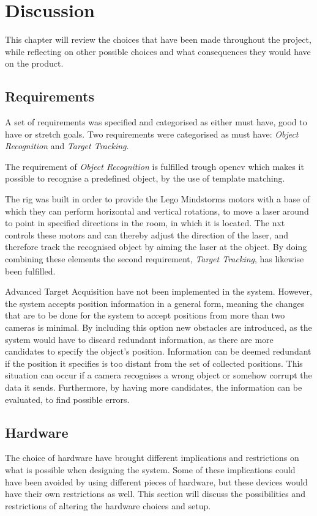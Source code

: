 \chapter{Discussion}
\label{chpt:discussion}
This chapter will review the choices that have been made throughout the project, while reflecting on other possible choices and what consequences they would have on the product.

\section{Requirements}\label{sec_disc_requirements}
A set of requirements was specified and categorised as either must have, good to have or stretch goals. Two requirements were categorised as must have: \textit{Object Recognition} and \textit{Target Tracking}.

The requirement of \textit{Object Recognition} is fulfilled trough \gls{opencv} which makes it possible to recognise a predefined object, by the use of template matching. 

The rig was built in order to provide the Lego Mindstorms motors with a base of which they can perform horizontal and vertical rotations, to move a laser around to point in specified directions in the room, in which it is located.
The \gls{nxt} controls these motors and can thereby adjust the direction of the laser, and therefore track the recognised object by aiming the laser at the object.
By doing combining these elements the second requirement, \textit{Target Tracking}, has likewise been fulfilled.

Advanced Target Acquisition have not been implemented in the system. However, the system accepts position information in a general form, meaning the changes that are to be done for the system to accept positions from more than two cameras is minimal. By including this option new obstacles are introduced, as the system would have to discard redundant information, as there are more candidates to specify the object's position. Information can be deemed redundant if the position it specifies is too distant from the set of collected positions. This situation can occur if a camera recognises a wrong object or somehow corrupt the data it sends. Furthermore, by having more candidates, the information can be evaluated, to find possible errors.

\section{Hardware}\label{sec:disc_hardware}
The choice of hardware have brought different implications and restrictions on what is possible when designing the system. Some of these implications could have been avoided by using different pieces of hardware, but these devices would have their own restrictions as well. This section will discuss the possibilities and restrictions of altering the hardware choices and setup.

